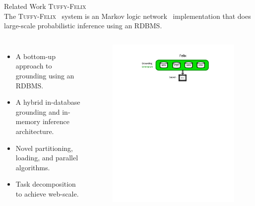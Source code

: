 \documentclass[onlymath,xcolor=pdftex,dvipsnames,table]{beamer}
\newcommand{\tuffy}{\textsc{Tuffy}\xspace}
\newcommand{\felix}{\textsc{Felix}\xspace}
\newcommand{\head}[1]{{\large\color{OliveGreen}#1\\[2pt]}}
\begin{document}
\begin{frame}{Related Work}
\head{\tuffy-\felix}
The \tuffy-\felix~\cite{DBLP:journals/pvldb/NiuRDS11,2011arXiv1108.0294N} system is an Markov logic network~\cite{richardson2006markov} implementation that does large-scale probabilistic inference using an RDBMS.
\begin{columns}[c]
  \begin{itemize}
    \item A bottom-up approach to grounding using an RDBMS.
    \item A hybrid in-database grounding and in-memory inference architecture.
    \item Novel partitioning, loading, and parallel algorithms.
    \item Task decomposition to achieve web-scale.
  \end{itemize}

  \begin{figure}
    \centering
    \includegraphics[clip,trim=125pt 500pt 125pt 30pt,width=\linewidth]{distfelix.pdf}
  \end{figure}
\end{columns}
\end{frame}
\end{document}
